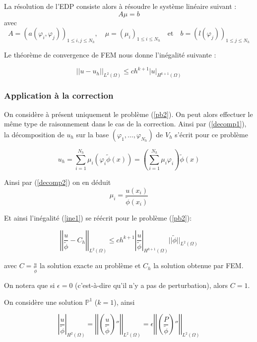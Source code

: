 La résolution de l'EDP consiste alors à résoudre le système linéaire suivant :
$$A\mu=b$$
avec
$$A=(a(\varphi_i,\varphi_j))_{1\le i,j\le N_h}, \quad \mu=(\mu_i)_{1\le i\le N_h} \quad \text{et} \quad b=(l(\varphi_j))_{1\le j\le N_h}$$

Le théorème de convergence de FEM nous donne l'inégalité suivante :

\begin{equation}
	||u-u_h||_{L^2(\Omega)}\le ch^{k+1}|u|_{H^{k+1}(\Omega)} \label{ine1}
\end{equation}

\subsubsection*{Application à la correction}

On considère à présent uniquement le problème (\ref{pb2}). On peut alors effectuer le même type de raisonnement dans le cas de la correction. Ainsi par (\ref{decomp1}), la décomposition de $u_h$ sur la base $(\varphi_1,\dots,\varphi_{N_h})$ de $V_h$ s'écrit pour ce problème

\begin{equation}
	u_h=\sum_{i=1}^{N_h}\mu_i(\varphi_i\tilde{\phi}(x))=\left(\sum_{i=1}^{N_h}\mu_i\varphi_i\right)\tilde{\phi}(x) \label{decomp2}
\end{equation}

Ainsi par (\ref{decomp2}) on en déduit
$$\mu_i=\frac{u(x_i)}{\tilde{\phi}(x_i)}$$

Et ainsi l'inégalité (\ref{ine1}) se réécrit pour le problème (\ref{pb2}):

\begin{equation}
	\left|\left|\frac{u}{\tilde{\phi}}-C_h\right|\right|_{L^2(\Omega)}\le ch^{k+1}\left|\frac{u}{\tilde{\phi}}\right|_{H^{k+1}(\Omega)}||\tilde{\phi}||_{L^2(\Omega)} \label{ine2}
\end{equation}

avec $C=\frac{u}{\tilde{\phi}}$ la solution exacte au problème et $C_h$ la solution obtenue par FEM.

\begin{Rem}
	On notera que si $\epsilon=0$ (c'est-à-dire qu'il n'y a pas de perturbation), alors $C=1$.
\end{Rem}

On considère une solution $\mathbb{P}^1$ ($k=1$), ainsi

\begin{equation}
	\left|\frac{u}{\tilde{\phi}}\right|_{H^2(\Omega)}=\left|\left|\left(\frac{u}{\tilde{\phi}}\right)''\right|\right|_{L^2(\Omega)}=\epsilon\left|\left|\left(\frac{P}{\tilde{\phi}}\right)''\right|\right|_{L^2(\Omega)} \label{der1}
\end{equation}

